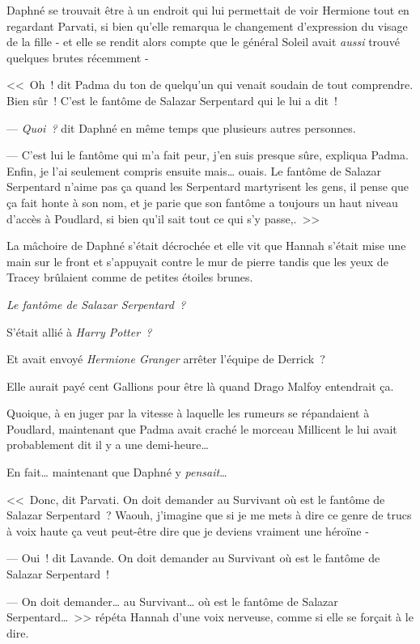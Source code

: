 Daphné se trouvait être à un endroit qui lui permettait de voir Hermione tout en regardant Parvati, si bien qu'elle remarqua le changement d'expression du visage de la fille - et elle se rendit alors compte que le général Soleil avait \emph{aussi} trouvé quelques brutes récemment -

<<~Oh~! dit Padma du ton de quelqu'un qui venait soudain de tout comprendre. Bien sûr~! C'est le fantôme de Salazar Serpentard qui le lui a dit~!

--- \emph{Quoi~?} dit Daphné en même temps que plusieurs autres personnes.

--- C'est lui le fantôme qui m'a fait peur, j'en suis presque sûre, expliqua Padma. Enfin, je l'ai seulement compris ensuite mais… ouais. Le fantôme de Salazar Serpentard n'aime pas ça quand les Serpentard martyrisent les gens, il pense que ça fait honte à son nom, et je parie que son fantôme a toujours un haut niveau d'accès à Poudlard, si bien qu'il sait tout ce qui s'y passe,.~>>

La mâchoire de Daphné s'était décrochée et elle vit que Hannah s'était mise une main sur le front et s'appuyait contre le mur de pierre tandis que les yeux de Tracey brûlaient comme de petites étoiles brunes.

\emph{Le fantôme de Salazar Serpentard~?}

S'était allié à \emph{Harry Potter~?}

Et avait envoyé \emph{Hermione Granger} arrêter l'équipe de Derrick~?

Elle aurait payé cent Gallions pour être là quand Drago Malfoy entendrait ça.

Quoique, à en juger par la vitesse à laquelle les rumeurs se répandaient à Poudlard, maintenant que Padma avait craché le morceau Millicent le lui avait probablement dit il y a une demi-heure…

En fait… maintenant que Daphné y \emph{pensait}…

<<~Donc, dit Parvati. On doit demander au Survivant où est le fantôme de Salazar Serpentard~? Waouh, j'imagine que si je me mets à dire ce genre de trucs à voix haute ça veut peut-être dire que je deviens vraiment une héroïne -

--- Oui~! dit Lavande. On doit demander au Survivant où est le fantôme de Salazar Serpentard~!

--- On doit demander… au Survivant… où est le fantôme de Salazar Serpentard…~>> répéta Hannah d'une voix nerveuse, comme si elle se forçait à le dire.

